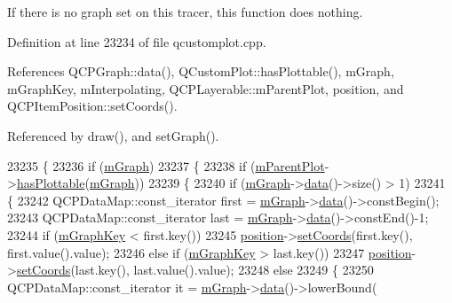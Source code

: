 If there is no graph set on this tracer, this function does nothing. 

Definition at line 23234 of file qcustomplot.\+cpp.



References Q\+C\+P\+Graph\+::data(), Q\+Custom\+Plot\+::has\+Plottable(), m\+Graph, m\+Graph\+Key, m\+Interpolating, Q\+C\+P\+Layerable\+::m\+Parent\+Plot, position, and Q\+C\+P\+Item\+Position\+::set\+Coords().



Referenced by draw(), and set\+Graph().


\begin{DoxyCode}
23235 \{
23236   \textcolor{keywordflow}{if} (\hyperlink{class_q_c_p_item_tracer_a2d70cf616b579563aa15f796dfc143ac}{mGraph})
23237   \{
23238     \textcolor{keywordflow}{if} (\hyperlink{class_q_c_p_layerable_aa2a528433e44db02b8aef23c1f9f90ed}{mParentPlot}->\hyperlink{class_q_custom_plot_a4fc28914e2ee91aab424b7ce46b6bdf1}{hasPlottable}(\hyperlink{class_q_c_p_item_tracer_a2d70cf616b579563aa15f796dfc143ac}{mGraph}))
23239     \{
23240       \textcolor{keywordflow}{if} (\hyperlink{class_q_c_p_item_tracer_a2d70cf616b579563aa15f796dfc143ac}{mGraph}->\hyperlink{class_q_c_p_graph_a2f58436df4f86a2792b776a21642b3d9}{data}()->size() > 1)
23241       \{
23242         QCPDataMap::const\_iterator first = \hyperlink{class_q_c_p_item_tracer_a2d70cf616b579563aa15f796dfc143ac}{mGraph}->\hyperlink{class_q_c_p_graph_a2f58436df4f86a2792b776a21642b3d9}{data}()->constBegin();
23243         QCPDataMap::const\_iterator last = \hyperlink{class_q_c_p_item_tracer_a2d70cf616b579563aa15f796dfc143ac}{mGraph}->\hyperlink{class_q_c_p_graph_a2f58436df4f86a2792b776a21642b3d9}{data}()->constEnd()-1;
23244         \textcolor{keywordflow}{if} (\hyperlink{class_q_c_p_item_tracer_a8fa20f2e9ee07d21fd7c8d30ba4702ca}{mGraphKey} < first.key())
23245           \hyperlink{class_q_c_p_item_tracer_a69917e2fdb2b3a929c196958feee7cbe}{position}->\hyperlink{class_q_c_p_item_position_aa988ba4e87ab684c9021017dcaba945f}{setCoords}(first.key(), first.value().value);
23246         \textcolor{keywordflow}{else} \textcolor{keywordflow}{if} (\hyperlink{class_q_c_p_item_tracer_a8fa20f2e9ee07d21fd7c8d30ba4702ca}{mGraphKey} > last.key())
23247           \hyperlink{class_q_c_p_item_tracer_a69917e2fdb2b3a929c196958feee7cbe}{position}->\hyperlink{class_q_c_p_item_position_aa988ba4e87ab684c9021017dcaba945f}{setCoords}(last.key(), last.value().value);
23248         \textcolor{keywordflow}{else}
23249         \{
23250           QCPDataMap::const\_iterator it = \hyperlink{class_q_c_p_item_tracer_a2d70cf616b579563aa15f796dfc143ac}{mGraph}->\hyperlink{class_q_c_p_graph_a2f58436df4f86a2792b776a21642b3d9}{data}()->lowerBound(

\end{DoxyCode}
